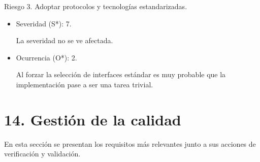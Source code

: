 \documentclass[
11pt, %
]{charter}
\begin{document}
Riesgo 3. Adoptar protocolos y tecnologías estandarizadas.
  \begin{itemize}
	\item Severidad (S*): 7.
	
	La severidad no se ve afectada.
	\item Ocurrencia (O*): 2.
	
	Al forzar la selección de interfaces estándar es muy probable que la implementación pase a ser una tarea trivial.
	\end{itemize}




\section{14. Gestión de la calidad}
\label{sec:calidad}

En esta sección se presentan los requisitos más relevantes junto a sus acciones de verificación y validación.
\end{document}
